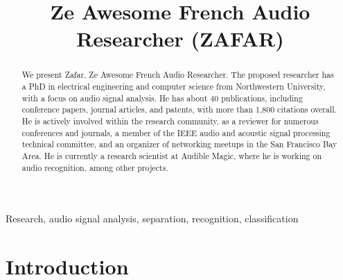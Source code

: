 \documentclass{article}
\title{Ze Awesome French Audio Researcher (ZAFAR)}
\begin{document}
\maketitle

\begin{abstract}
We present Zafar, Ze Awesome French Audio Researcher. The proposed researcher has a PhD in electrical engineering and computer science from Northwestern University, with a focus on audio signal analysis. He has about 40 publications, including conference papers, journal articles, and patents, with more than 1,800 citations overall. He is actively involved within the research community, as a reviewer for numerous conferences and journals, a member of the IEEE audio and acoustic signal processing technical committee, and an organizer of networking meetups in the San Francisco Bay Area. He is currently a research scientist at Audible Magic, where he is working on audio recognition, among other projects.
\end{abstract}

\begin{keywords}
Research, audio signal analysis, separation, recognition, classification
\end{keywords}

\section{Introduction}
\label{sec:intro}

\nocite{patent_rafii_mar2023}
\nocite{patent_cremer_jan2023}
\nocite{patent_cremer_dec2022}
\nocite{patent_rafii_jul2022}
\nocite{patent_berrian_jun2022}
\nocite{patent_liu_jun2022}
\nocite{patent_rafii_jun2022}
\nocite{patent_rafii_mar2022}
\nocite{patent_rafii_oct2021}
\nocite{patent_rafii_may2021}
\nocite{patent_rafii_oct2020}
\nocite{patent_rafii_jul2020}
\nocite{patent_coover_mar2020}
\nocite{patent_pardo_jul2015}

\nocite{article_rafii_may2022}
\nocite{article_rafii_nov2018}
\nocite{article_rafii_aug2018}
\nocite{article_rafii_dec2014}
\nocite{article_liutkus_aug2014}
\nocite{article_rafii_jan2013}
\nocite{article_sabin_jun2013}

\nocite{inproceedings_vartakavi_aug2021}
\nocite{inproceedings_kim_sep2018}
\nocite{inproceedings_seetharaman_mar2017}
\nocite{inproceedings_fitzgerald_mar2017}
\nocite{inproceedings_liutkus_feb2017}
\nocite{inproceedings_ono_aug2015}
\nocite{inproceedings_rafii_apr2015}
\nocite{inproceedings_liutkus_apr2015}
\nocite{inproceedings_fitzgerald_jun2014}
\nocite{inproceedings_liutkus_may2014}
\nocite{inproceedings_rafii_may2014}
\nocite{inproceedings_rafii_nov2013}
\nocite{inproceedings_rafii_may2013}
\nocite{inproceedings_rafii_oct2012}
\nocite{inproceedings_liutkus_mar2012}
\nocite{inproceedings_cartwright_aug2011}
\nocite{inproceedings_rafii_may2011}
\nocite{inproceedings_rafii_may2011_2}
\nocite{inproceedings_rafii_oct2009}
\end{document}
